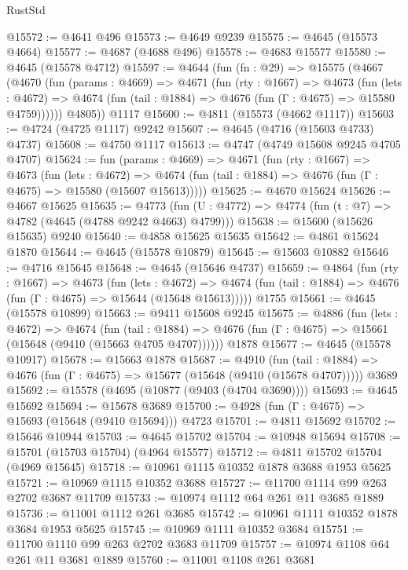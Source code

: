 \begin{lexlean}{RustStd}
\begin{coremodule}
@15572 := @4641 @496
@15573 := @4649 @9239
@15575 := @4645 (@15573 @4664)
@15577 := @4687 (@4688 @496)
@15578 := @4683 @15577
@15580 := @4645 (@15578 @4712)
@15597 := @4644
    (fun (fn : @29) =>
    @15575
      (@4667
        (@4670
          (fun (params : @4669) =>
          @4671
            (fun (rty : @1667) =>
            @4673
              (fun (lets : @4672) =>
              @4674 (fun (tail : @1884) => @4676 (fun (Γ : @4675) => @15580 @4759))))))
        @4805))
    @1117
@15600 := @4811 (@15573 (@4662 @1117))
@15603 := @4724 (@4725 @1117) @9242
@15607 := @4645 (@4716 (@15603 @4733) @4737)
@15608 := @4750 @1117
@15613 := @4747 (@4749 @15608 @9245 @4705 @4707)
@15624 := fun (params : @4669) =>
  @4671
    (fun (rty : @1667) =>
    @4673
      (fun (lets : @4672) =>
      @4674 (fun (tail : @1884) => @4676 (fun (Γ : @4675) => @15580 (@15607 @15613)))))
@15625 := @4670 @15624
@15626 := @4667 @15625
@15635 := @4773 (fun (U : @4772) => @4774 (fun (t : @7) => @4782 (@4645 (@4788 @9242 @4663) @4799)))
@15638 := @15600 (@15626 @15635) @9240
@15640 := @4858 @15625 @15635
@15642 := @4861 @15624 @1870
@15644 := @4645 (@15578 @10879)
@15645 := @15603 @10882
@15646 := @4716 @15645
@15648 := @4645 (@15646 @4737)
@15659 := @4864
    (fun (rty : @1667) =>
    @4673
      (fun (lets : @4672) =>
      @4674 (fun (tail : @1884) => @4676 (fun (Γ : @4675) => @15644 (@15648 @15613)))))
    @1755
@15661 := @4645 (@15578 @10899)
@15663 := @9411 @15608 @9245
@15675 := @4886
    (fun (lets : @4672) =>
    @4674
      (fun (tail : @1884) =>
      @4676 (fun (Γ : @4675) => @15661 (@15648 (@9410 (@15663 @4705 @4707))))))
    @1878
@15677 := @4645 (@15578 @10917)
@15678 := @15663 @1878
@15687 := @4910
    (fun (tail : @1884) => @4676 (fun (Γ : @4675) => @15677 (@15648 (@9410 (@15678 @4707)))))
    @3689
@15692 := @15578 (@4695 (@10877 (@9403 (@4704 @3690))))
@15693 := @4645 @15692
@15694 := @15678 @3689
@15700 := @4928 (fun (Γ : @4675) => @15693 (@15648 (@9410 @15694))) @4723
@15701 := @4811 @15692
@15702 := @15646 @10944
@15703 := @4645 @15702
@15704 := @10948 @15694
@15708 := @15701 (@15703 @15704) (@4964 @15577)
@15712 := @4811 @15702 @15704 (@4969 @15645)
@15718 := @10961 @1115 @10352 @1878 @3688 @1953 @5625
@15721 := @10969 @1115 @10352 @3688
@15727 := @11700 @1114 @99 @263 @2702 @3687 @11709
@15733 := @10974 @1112 @64 @261 @11 @3685 @1889
@15736 := @11001 @1112 @261 @3685
@15742 := @10961 @1111 @10352 @1878 @3684 @1953 @5625
@15745 := @10969 @1111 @10352 @3684
@15751 := @11700 @1110 @99 @263 @2702 @3683 @11709
@15757 := @10974 @1108 @64 @261 @11 @3681 @1889
@15760 := @11001 @1108 @261 @3681

\end{coremodule}
\end{lexlean}
